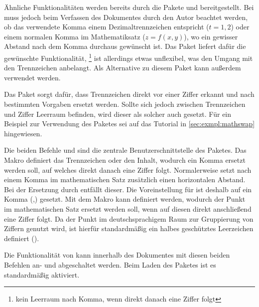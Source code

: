 Ähnliche Funktionalitäten werden bereits durch die Pakete  und 
 bereitgestellt. Bei  muss jedoch beim
Verfassen des Dokumentes durch den Autor beachtet werden, ob das verwendete
Komma einem Dezimaltrennzeichen entspricht ($t=1,\!2$) oder einem normalen 
Komma im Mathematiksatz ($z=f(x,y)$), wo ein gewisser Abstand nach dem Komma 
durchaus gewünscht ist. Das Paket  liefert dafür die gewünschte 
Funktionalität,%
\footnote{kein Leerraum nach Komma, wenn direkt danach eine Ziffer folgt}
ist allerdings etwas unflexibel, was den Umgang mit den Trennzeichen anbelangt.
Als Alternative zu diesem Paket kann außerdem  verwendet 
werden.

Das Paket  sorgt dafür, dass Trennzeichen direkt vor einer 
Ziffer erkannt und nach bestimmten Vorgaben ersetzt werden. Sollte sich jedoch 
zwischen Trennzeichen und Ziffer Leerraum befinden, wird dieser als solcher
auch gesetzt. Für ein Beispiel zur Verwendung des Paketes sei auf das Tutorial 
 in \autoref{sec:exmpl:mathswap} hingewiesen.

\begin{Declaration}{}
\begin{Declaration}{}
\printdeclarationlist%
%
Die beiden Befehle  und  sind die zentrale 
Benutzerschnittstelle des Paketes. Das Makro  definiert das 
Trennzeichen oder den Inhalt, wodurch ein Komma ersetzt werden soll, auf 
welches direkt danach eine Ziffer folgt. Normalerweise setzt 
nach einem Komma im mathematischen Satz zusätzlich einen horizontalen Abstand.
Bei der Ersetzung durch  entfällt dieser. Die Voreinstellung
für  ist deshalb auf ein Komma (,) gesetzt. Mit dem Makro 
 kann definiert werden, wodurch der Punkt im mathematischen 
Satz ersetzt werden soll, wenn auf diesen direkt anschließend eine Ziffer 
folgt. Da der Punkt im deutschsprachigem Raum zur Gruppierung von Ziffern 
genutzt wird, ist hierfür standardmäßig ein halbes geschütztes Leerzeichen 
definiert (\Macro*{,}).
\end{Declaration}
\end{Declaration}
\begin{Declaration}[v2.02]{}
\begin{Declaration}[v2.02]{}
\printdeclarationlist%
%
Die Funktionalität von  kann innerhalb des Dokumentes mit 
diesen beiden Befehlen an- und abgeschaltet werden. Beim Laden des Paketes ist 
es standardmäßig aktiviert.
\end{Declaration}
\end{Declaration}



